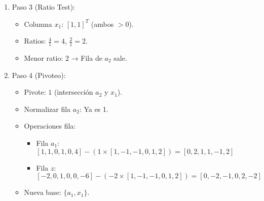 \begin{enumerate}
  \item Paso 3 (Ratio Test):
  \begin{itemize}
    \item Columna \(x_1\): \([1, 1]^T\) (ambos \(> 0\)).
    \item Ratios: \(\frac{4}{1} = 4\), \(\frac{2}{1} = 2\).
    \item Menor ratio: \(2\) → Fila de \(a_2\) sale.
  \end{itemize}
  \item Paso 4 (Pivoteo):
  \begin{itemize}
    \item Pivote: \(1\) (intersección \(a_2\) y \(x_1\)).
    \item Normalizar fila \(a_2\): Ya es 1.
    \item Operaciones fila:
      \begin{itemize}
        \item Fila \(a_1\): \([1, 1, 0, 1, 0, 4] - (1 \times [1, -1, -1, 0, 1, 2]) = [0, 2, 1, 1, -1, 2]\)
        \item Fila \(z\): \([-2, 0, 1, 0, 0, -6] - (-2 \times [1, -1, -1, 0, 1, 2]) = [0, -2, -1, 0, 2, -2]\)
      \end{itemize}
    \item Nueva base: \(\{a_1, x_1\}\).
  \end{itemize}
\end{enumerate}




